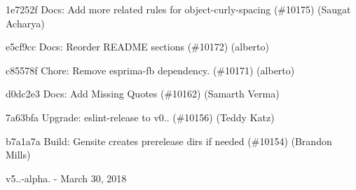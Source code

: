 \begin{DoxyItemize}
\item 1e7252f Docs\+: Add more related rules for object-\/curly-\/spacing (\#10175) (Saugat Acharya)
\item e5cf9cc Docs\+: Reorder README sections (\#10172) (alberto)
\item c85578f Chore\+: Remove {\ttfamily esprima-\/fb} dependency. (\#10171) (alberto)
\item d0dc2e3 Docs\+: Add Missing Quotes (\#10162) (Samarth Verma)
\item 7a63bfa Upgrade\+: eslint-\/release to v0.. (\#10156) (Teddy Katz)
\item b7a1a7a Build\+: Gensite creates prerelease dirs if needed (\#10154) (Brandon Mills)
\end{DoxyItemize}

v5..-\/alpha. -\/ March 30, 2018


